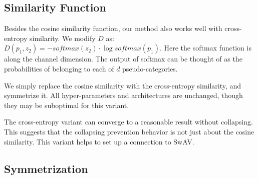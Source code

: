 \documentclass[conference]{IEEEtran}
\begin{document}
\subsection{Similarity Function}
Besides the cosine similarity function, our method also works well with cross-entropy similarity. We modify $D$ as: $D(p_1, z_2) = -softmax(z_2) \cdot \log softmax(p_1)$. Here the softmax function is along the channel dimension.
The output of softmax can be thought of as the probabilities of belonging to each of $d$ pseudo-categories.

We simply replace the cosine similarity with the cross-entropy similarity, and symmetrize it. All hyper-parameters and architectures are unchanged, though they may be suboptimal for this variant.

The cross-entropy variant can converge to a reasonable result without collapsing. This suggests that the collapsing prevention behavior is not just about the cosine similarity.
This variant helps to set up a connection to SwAV. 

\subsection{Symmetrization}


\end{document}

